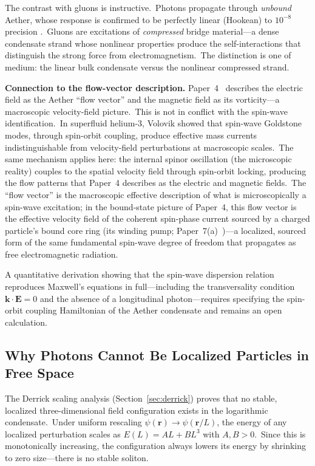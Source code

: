 ﻿\documentclass[12pt,letterpaper]{article}
\begin{document}
The contrast with gluons is instructive.\ Photons propagate through \emph{unbound}
Aether, whose response is confirmed to be perfectly linear (Hookean) to $10^{-8}$
precision \cite{reinhardt2007}.\ Gluons are excitations of \emph{compressed} bridge
material---a dense condensate strand whose nonlinear properties produce the
self-interactions that distinguish the strong force from electromagnetism.\ The
distinction is one of medium: the linear bulk condensate versus the nonlinear
compressed strand.

\textbf{Connection to the flow-vector description.}\quad
Paper~4~\cite{otto-em} describes the electric field as the Aether ``flow vector''
and the magnetic field as its vorticity---a macroscopic velocity-field picture.\
This is not in conflict with the spin-wave identification.\ In superfluid
helium-3, Volovik \cite{volovik2003} showed that spin-wave Goldstone modes,
through spin-orbit coupling, produce effective mass currents indistinguishable
from velocity-field perturbations at macroscopic scales.\ The same mechanism
applies here: the internal spinor oscillation (the microscopic reality) couples
to the spatial velocity field through spin-orbit locking, producing the flow
patterns that Paper~4 describes as the electric and magnetic fields.\ The
``flow vector'' is the macroscopic effective description of what is
microscopically a spin-wave excitation; in the bound-state picture of
Paper~4, this flow vector is the effective velocity field of the coherent
spin-phase current sourced by a charged particle's bound core ring (its
winding pump; Paper~7(a)~\cite{otto-boundcore})---a localized, sourced form
of the same fundamental spin-wave degree of freedom that propagates as free
electromagnetic radiation.

A quantitative derivation showing that the spin-wave dispersion relation reproduces
Maxwell's equations in full---including the transversality condition
$\mathbf{k} \cdot \mathbf{E} = 0$ and the absence of a longitudinal photon---requires
specifying the spin-orbit coupling Hamiltonian of the Aether condensate and remains
an open calculation.


\subsection{Why Photons Cannot Be Localized Particles in Free Space}

The Derrick scaling analysis (Section~\ref{sec:derrick}) proves that no stable, localized
three-dimensional field configuration exists in the logarithmic condensate.\ Under uniform
rescaling $\psi(\mathbf{r}) \to \psi(\mathbf{r}/L)$, the energy of any localized
perturbation scales as $E(L) = AL + BL^3$ with $A, B > 0$.\ Since this is monotonically
increasing, the configuration always lowers its energy by shrinking to zero size---there
is no stable soliton.
\end{document}
